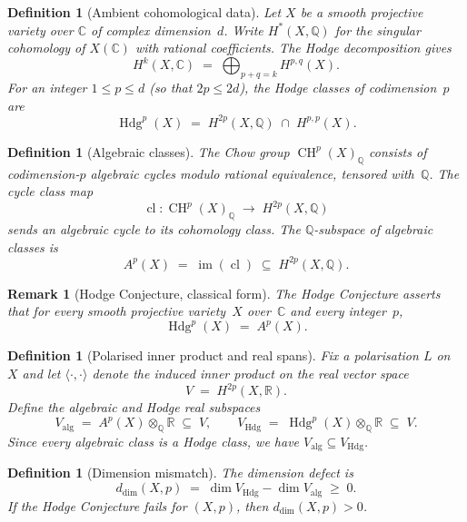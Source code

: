 \documentclass[11pt]{article}
\newtheorem{definition}[theorem]{Definition}
\newtheorem{remark}[theorem]{Remark}
\theoremstyle{definition}
\DeclareMathOperator{\cl}{cl}
\DeclareMathOperator{\CH}{CH}
\DeclareMathOperator{\im}{im}
\DeclareMathOperator{\Hdg}{Hdg}
\begin{document}

\begin{definition}[Ambient cohomological data]
\label{def:ambient}
Let $X$ be a smooth projective variety over $\mathbb{C}$ of complex
dimension~$d$.  Write $H^{*}(X,\mathbb{Q})$ for the singular
cohomology of $X(\mathbb{C})$ with rational coefficients.  The Hodge
decomposition gives
\[
  H^{k}(X,\mathbb{C})
  \;=\;
  \bigoplus_{p+q=k} H^{p,q}(X).
\]
For an integer $1\le p\le d$ (so that $2p\le 2d$), the
\emph{Hodge classes of codimension~$p$} are
\[
  \Hdg^{p}(X)
  \;=\;
  H^{2p}(X,\mathbb{Q})\;\cap\; H^{p,p}(X).
\]
\end{definition}

\begin{definition}[Algebraic classes]
\label{def:algebraic}
The \emph{Chow group} $\CH^{p}(X)_{\mathbb{Q}}$ consists of
codimension-$p$ algebraic cycles modulo rational equivalence, tensored
with~$\mathbb{Q}$.  The \emph{cycle class map}
\[
  \cl \colon \CH^{p}(X)_{\mathbb{Q}}
  \;\longrightarrow\;
  H^{2p}(X,\mathbb{Q})
\]
sends an algebraic cycle to its cohomology class.  The
$\mathbb{Q}$-subspace of \emph{algebraic classes} is
\[
  A^{p}(X) \;=\; \im(\cl)
  \;\subseteq\; H^{2p}(X,\mathbb{Q}).
\]
\end{definition}

\begin{remark}[Hodge Conjecture, classical form]
\label{rem:hodge-classical}
The Hodge Conjecture asserts that for every smooth projective
variety~$X$ over~$\mathbb{C}$ and every integer~$p$,
\[
  \Hdg^{p}(X) \;=\; A^{p}(X).
\]
\end{remark}


\begin{definition}[Polarised inner product and real spans]
\label{def:polarised}
Fix a polarisation $L$ on $X$ and let $\langle\cdot,\cdot\rangle$
denote the induced inner product on the real vector space
\[
  V \;=\; H^{2p}(X,\mathbb{R}).
\]
Define the \emph{algebraic} and \emph{Hodge} real subspaces
\[
  V_{\mathrm{alg}} \;=\; A^{p}(X)\otimes_{\mathbb{Q}}\mathbb{R}
  \;\subseteq\; V,
  \qquad
  V_{\mathrm{Hdg}} \;=\; \Hdg^{p}(X)\otimes_{\mathbb{Q}}\mathbb{R}
  \;\subseteq\; V.
\]
Since every algebraic class is a Hodge class, we have
$V_{\mathrm{alg}}\subseteq V_{\mathrm{Hdg}}$.
\end{definition}

\begin{definition}[Dimension mismatch]
\label{def:dim-mismatch}
The \emph{dimension defect} is
\[
  d_{\dim}(X,p)
  \;=\;
  \dim V_{\mathrm{Hdg}} - \dim V_{\mathrm{alg}}
  \;\ge\; 0.
\]
If the Hodge Conjecture fails for $(X,p)$, then
$d_{\dim}(X,p)>0$.
\end{definition}
\end{document}
